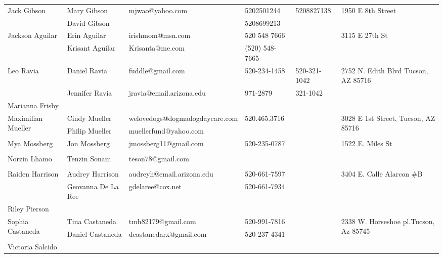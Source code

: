 \documentclass[landscape]{article}\usepackage[]{graphicx}\usepackage[]{color}
\begin{document}
\begin{longtable}{|p{100pt}|p{100pt}|p{140pt}|p{60pt}|p{64pt}|p{120pt}|}
\hline
\multirow{2}{100pt}{Jack Gibson} & Mary Gibson & mjwao@yahoo.com & 5202501244 & 5208827138 & \multirow{2}{120pt}{1950 E 8th Street} \\
 & David Gibson &  & 5208699213 &  & \\
\hline
\multirow{2}{100pt}{Jackson Aguilar} & Erin Aguilar & irishmom@msn.com & 520 548 7666 &  & \multirow{2}{120pt}{3115 E 27th St} \\
 & Krisant Aguilar & Krisanta@me.com & (520) 548-7665 &  & \\
\hline
\multirow{2}{100pt}{Leo Ravia} & Daniel Ravia & fuddle@gmail.com & 520-234-1458 & 520-321-1042 & \multirow{2}{120pt}{2752 N. Edith Blvd Tucson, AZ 85716} \\
 & Jennifer Ravia & jravia@email.arizona.edu & 971-2879 & 321-1042 & \\
\hline
\multirow{2}{100pt}{Marianna Frisby} &  &  &  &  & \multirow{2}{120pt}{} \\
 &  &  &  &  & \\
\hline
\multirow{2}{100pt}{Maximilian Mueller} & Cindy Mueller & welovedogs@dogmadogdaycare.com & 520.465.3716 &  & \multirow{2}{120pt}{3028 E 1st Street, Tucson, AZ 85716} \\
 & Philip Mueller & muellerfund@yahoo.com &  &  & \\
\hline
\multirow{2}{100pt}{Mya Mossberg} & Jon Mossberg & jmossberg11@gmail.com & 520-235-0787 &  & \multirow{2}{120pt}{1522 E. Miles St} \\
 &  &  &  &  & \\
\hline
\multirow{2}{100pt}{Norzin Lhamo} & Tenzin Sonam & teson78@gmail.com &  &  & \multirow{2}{120pt}{} \\
 &  &  &  &  & \\
\hline
\multirow{2}{100pt}{Raiden Harrison} & Audrey Harrison & audreyh@email.arizona.edu & 520-661-7597 &  & \multirow{2}{120pt}{3404 E. Calle Alarcon \#B} \\
 & Geovanna De La Ree & gdelaree@cox.net & 520-661-7934 &  & \\
\hline
\multirow{2}{100pt}{Riley Pierson} &  &  &  &  & \multirow{2}{120pt}{} \\
 &  &  &  &  & \\
\hline
\multirow{2}{100pt}{Sophia Castaneda} & Tina Castaneda & tmh82179@gmail.com & 520-991-7816 &  & \multirow{2}{120pt}{2338 W. Horseshoe pl.Tucson, Az 85745} \\
 & Daniel Castaneda & dcastanedarx@gmail.com & 520-237-4341 &  & \\
\hline
\multirow{2}{100pt}{Victoria Salcido} &  &  &  &  & \multirow{2}{120pt}{} \\
 &  &  &  &  & \\
\hline
\end{longtable}
\newpage
\end{document}
